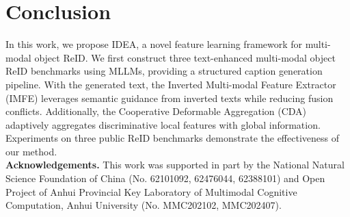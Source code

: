 \section{Conclusion}
\label{sec:conclusion}
In this work, we propose IDEA, a novel feature learning framework for multi-modal object ReID.
%
We first construct three text-enhanced multi-modal object ReID benchmarks using MLLMs, providing a structured caption generation pipeline.
%
With the generated text, the Inverted Multi-modal Feature Extractor (IMFE) leverages semantic guidance from inverted texts while reducing fusion conflicts.
%
Additionally, the Cooperative Deformable Aggregation (CDA) adaptively aggregates discriminative local features with global information.
%
Experiments on three public ReID benchmarks demonstrate the effectiveness of our method.
%
\\
{\small
\textbf{Acknowledgements.}
This work was supported in part by the National Natural Science Foundation of China (No. 62101092, 62476044, 62388101) and Open Project of Anhui Provincial Key Laboratory of Multimodal Cognitive Computation, Anhui University (No. MMC202102, MMC202407).} %
\vspace*{-4mm} 